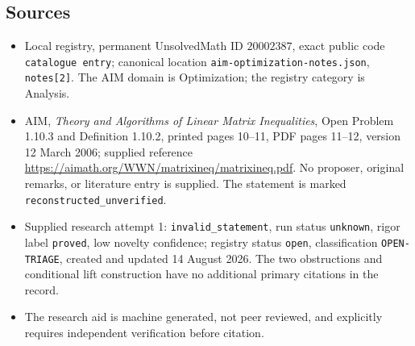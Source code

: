 \documentclass[11pt]{article}
\begin{document}
\subsection{Sources}
\begin{itemize}
\item Local registry, permanent UnsolvedMath ID \(20002387\), exact public code \texttt{catalogue entry}; canonical location \texttt{aim-optimization-notes.json}, \texttt{notes[2]}. The AIM domain is Optimization; the registry category is Analysis.
\item AIM, \emph{Theory and Algorithms of Linear Matrix Inequalities}, Open Problem 1.10.3 and Definition 1.10.2, printed pages 10--11, PDF pages 11--12, version 12 March 2006; supplied reference \url{https://aimath.org/WWN/matrixineq/matrixineq.pdf}. No proposer, original remarks, or literature entry is supplied. The statement is marked \texttt{reconstructed\_unverified}.
\item Supplied research attempt 1: \texttt{invalid\_statement}, run status \texttt{unknown}, rigor label \texttt{proved}, low novelty confidence; registry status \texttt{open}, classification \texttt{OPEN-TRIAGE}, created and updated 14 August 2026. The two obstructions and conditional lift construction have no additional primary citations in the record.
\item The research aid is machine generated, not peer reviewed, and explicitly requires independent verification before citation.
\end{itemize}
\end{document}
